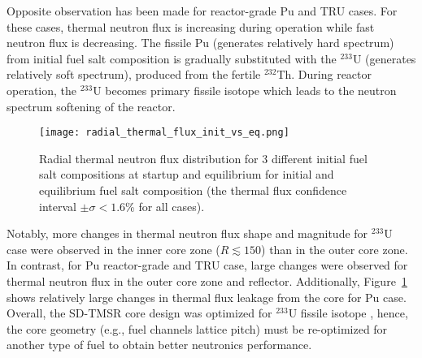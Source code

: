 Opposite observation has been made for reactor-grade Pu and TRU cases. For 
these cases, thermal neutron flux is increasing during operation while fast 
neutron flux is decreasing. The fissile Pu (generates relatively hard 
spectrum) from initial fuel salt composition is gradually substituted with the 
$^{233}$U (generates relatively soft spectrum), produced from the fertile 
$^{232}$Th. During reactor operation, the $^{233}$U becomes primary fissile 
isotope which leads to the neutron spectrum softening of the reactor. 
\begin{figure}[htp!] %
	\texttt{[image: radial\_thermal\_flux\_init\_vs\_eq.png]} 
	\caption{Radial thermal neutron flux distribution for 3 different initial 
		fuel salt compositions at startup and equilibrium for initial and 
		equilibrium fuel salt composition (the thermal flux confidence 
		interval 
		$\pm\sigma<1.6$\% for all cases).}
	\label{fig:thermal_flux}
\end{figure}

Notably, more changes in thermal neutron flux shape and magnitude for  
$^{233}$U case were observed in the inner core zone ($R\lesssim150$) than 
in the outer core zone. In contrast, for Pu reactor-grade and TRU case, large 
changes were observed for thermal neutron flux in the outer core zone and 
reflector. Additionally, Figure~\ref{fig:thermal_flux} shows relatively large 
changes in thermal flux leakage from the core for Pu case. Overall, the 
SD-TMSR core design was optimized for $^{233}$U fissile isotope 
\cite{li_optimization_2018}, hence, the core geometry (e.g., fuel channels  
lattice pitch) must be re-optimized for another type of fuel to obtain better 
neutronics performance.

